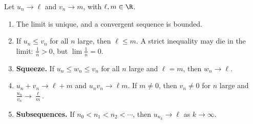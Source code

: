 \begin{propositionx}
Let $u_n\to\ell$ and $v_n\to m$, with $\ell,m\in\R$.
\begin{enumerate}[label=(\alph*)]
\item The limit is unique, and a convergent sequence is bounded.
\item If $u_n\le v_n$ for all $n$ large, then $\ell\le m$. A strict inequality may die in the limit: $\frac1n>0$, but $\lim\frac1n=0$.
\item \textbf{Squeeze.} If $u_n\le w_n\le v_n$ for all $n$ large and $\ell=m$, then $w_n\to\ell$.
\item $u_n+v_n\to\ell+m$ and $u_nv_n\to\ell m$. If $m\ne0$, then $v_n\ne0$ for $n$ large and $\frac{u_n}{v_n}\to\frac\ell m$.
\item \textbf{Subsequences.} If $n_0<n_1<n_2<\cdots$, then $u_{n_k}\to\ell$ as $k\to\infty$.
\end{enumerate}
\end{propositionx}
